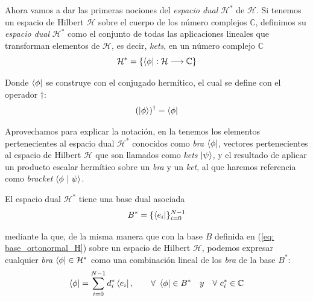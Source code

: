 \documentclass{article}
\numberwithin{equation}{section} %
\begin{document}
    \vspace{5mm}

    Ahora vamos a dar las primeras nociones del \textit{espacio dual} \( \mathcal{H} ^ {*} \) de \( \mathcal{H} \). Si tenemos un espacio de Hilbert \( \mathcal{H} \) sobre el cuerpo de los número complejos \( \mathbb{C} \), definimos su \textit{espacio dual} \( \mathcal{H} ^ {*} \) como el conjunto de todas las aplicaciones lineales que transforman elementos de \( \mathcal{H} \), es decir, \textit{kets}, en un número complejo \( \mathbb{C} \)
    \begin{equation*}
        \mathcal{H} ^ {*} = \{ \bra{\phi}: \mathcal{H} \longrightarrow \mathbb{C} \}
    \end{equation*}

    \vspace{1.5mm}

    Donde \( \bra{\phi} \) se construye con el conjugado hermítico, el cual se define con el operador \( \dagger \):
    \begin{equation*}
        ( \ket{\phi} )^{\dagger} = \bra{\phi}
    \end{equation*}

    \vspace{1.5mm}

    Aprovechamos para explicar la notación, en la tenemos los elementos pertenecientes al espacio dual \( \mathcal{H} ^ {*} \) conocidos como \textit{bra} \( \bra{\phi} \), vectores pertenecientes al espacio de Hilbert \( \mathcal{H} \) que son llamados como \textit{kets} \( \ket{\psi} \), y el resultado de aplicar un producto escalar hermítico sobre un \textit{bra} y un \textit{ket}, al que haremos referencia como \textit{bracket} \( \braket{\phi \ | \ \psi} \).

    \vspace{5mm}

    El espacio dual \( \mathcal{H} ^ {*} \) tiene una base dual asociada
    \begin{equation}
        B ^ {*} = \{ \bra{e_{i}} \} _{i = 0}^{N - 1}
    \end{equation}

    \vspace{1.5mm}

    mediante la que, de la misma manera que con la base \( B \) definida en (\ref{eq: base_ortonormal_H}) sobre un espacio de Hilbert \( \mathcal{H} \), podemos expresar cualquier \textit{bra} \( \bra{\phi} \in \mathcal{H} ^ {*} \) como una combinación lineal de los \textit{bra} de la base \( B ^ {*} \):
    \begin{equation}
        \bra{\phi} = \sum_{i = 0}^{N - 1} d_{i}^{*} \bra{e_{i}}, \qquad \forall \ \bra{\phi} \in B^{*} \quad y \quad \forall \ c_{i}^{*} \in \mathbb{C}
        \label{eq: combinacion_lineal_hilbert_dual}
    \end{equation}    
\end{document}
